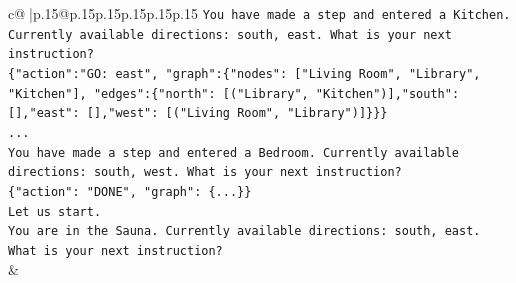 \documentclass{article}
\begin{document}
{\begin{supertabular}{c@{$\;$}|p{.15\linewidth}@{}p{.15\linewidth}p{.15\linewidth}p{.15\linewidth}p{.15\linewidth}p{.15\linewidth}}
{{{\texttt{You have made a step and entered a Kitchen. Currently available directions: south, east. What is your next instruction?} \\
\texttt{\{"action":"GO: east", "graph":\{"nodes": {[}"Living Room", "Library", "Kitchen"{]}, "edges":\{"north": {[}("Library", "Kitchen"){]},"south": {[}{]},"east": {[}{]},"west": {[}("Living Room", "Library"){]}\}\}\}} \\
\texttt{...} \\
\texttt{You have made a step and entered a Bedroom. Currently available directions: south, west. What is your next instruction?} \\
\texttt{\{"action": "DONE", "graph": \{...\}\}} \\
\texttt{Let us start.} \\
\texttt{You are in the Sauna. Currently available directions: south, east. What is your next instruction?} \\
            }
        }
    }
    & \\ \\


\end{supertabular}}
\end{document}
